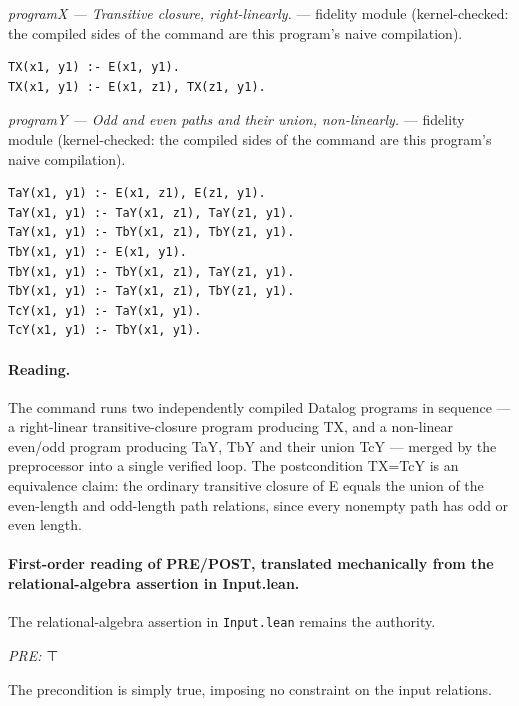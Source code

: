 \documentclass[10pt]{article}
\begin{document}
{\raggedright\textit{programX --- Transitive closure, right-linearly.} --- fidelity module (kernel-checked: the compiled sides of the command are this program's naive compilation).\par}

\begin{Verbatim}[fontsize=\scriptsize,breaklines=true,breakanywhere=true,frame=single,framesep=1.5mm]
TX(x1, y1) :- E(x1, y1).
TX(x1, y1) :- E(x1, z1), TX(z1, y1).
\end{Verbatim}

{\raggedright\textit{programY --- Odd and even paths and their union, non-linearly.} --- fidelity module (kernel-checked: the compiled sides of the command are this program's naive compilation).\par}

\begin{Verbatim}[fontsize=\scriptsize,breaklines=true,breakanywhere=true,frame=single,framesep=1.5mm]
TaY(x1, y1) :- E(x1, z1), E(z1, y1).
TaY(x1, y1) :- TaY(x1, z1), TaY(z1, y1).
TaY(x1, y1) :- TbY(x1, z1), TbY(z1, y1).
TbY(x1, y1) :- E(x1, y1).
TbY(x1, y1) :- TbY(x1, z1), TaY(z1, y1).
TbY(x1, y1) :- TaY(x1, z1), TbY(z1, y1).
TcY(x1, y1) :- TaY(x1, y1).
TcY(x1, y1) :- TbY(x1, y1).
\end{Verbatim}

\paragraph{Reading.} The command runs two independently compiled Datalog programs in sequence --- a right-linear transitive-closure program producing TX, and a non-linear even/odd program producing TaY, TbY and their union TcY --- merged by the preprocessor into a single verified loop. The postcondition TX=TcY is an equivalence claim: the ordinary transitive closure of E equals the union of the even-length and odd-length path relations, since every nonempty path has odd or even length.

\paragraph{First-order reading of PRE/POST, translated mechanically from the relational-algebra assertion in Input.lean.} The relational-algebra assertion in \texttt{Input.lean} remains the authority.

\textit{PRE:} ⊤\par The precondition is simply true, imposing no constraint on the input relations.
\end{document}

